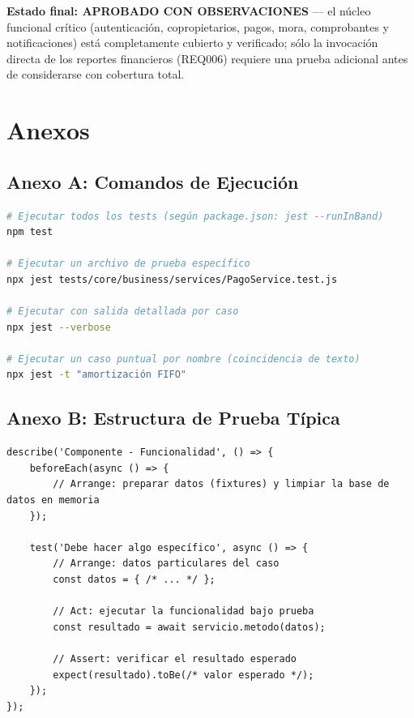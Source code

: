 \documentclass[12pt,a4paper]{article}
\begin{document}
\textbf{Estado final: APROBADO CON OBSERVACIONES} — el núcleo funcional crítico
(autenticación, copropietarios, pagos, mora, comprobantes y notificaciones) está
completamente cubierto y verificado; sólo la invocación directa de los reportes financieros
(REQ006) requiere una prueba adicional antes de considerarse con cobertura total.

\clearpage

\section*{Anexos}

\subsection*{Anexo A: Comandos de Ejecución}

\begin{lstlisting}[language=bash,caption={Comandos útiles para ejecutar la suite}]
# Ejecutar todos los tests (según package.json: jest --runInBand)
npm test

# Ejecutar un archivo de prueba específico
npx jest tests/core/business/services/PagoService.test.js

# Ejecutar con salida detallada por caso
npx jest --verbose

# Ejecutar un caso puntual por nombre (coincidencia de texto)
npx jest -t "amortización FIFO"
\end{lstlisting}

\subsection*{Anexo B: Estructura de Prueba Típica}

\begin{lstlisting}[caption={Patrón Arrange-Act-Assert utilizado en todo el proyecto}]
describe('Componente - Funcionalidad', () => {
    beforeEach(async () => {
        // Arrange: preparar datos (fixtures) y limpiar la base de datos en memoria
    });

    test('Debe hacer algo específico', async () => {
        // Arrange: datos particulares del caso
        const datos = { /* ... */ };

        // Act: ejecutar la funcionalidad bajo prueba
        const resultado = await servicio.metodo(datos);

        // Assert: verificar el resultado esperado
        expect(resultado).toBe(/* valor esperado */);
    });
});
\end{lstlisting}
\end{document}
